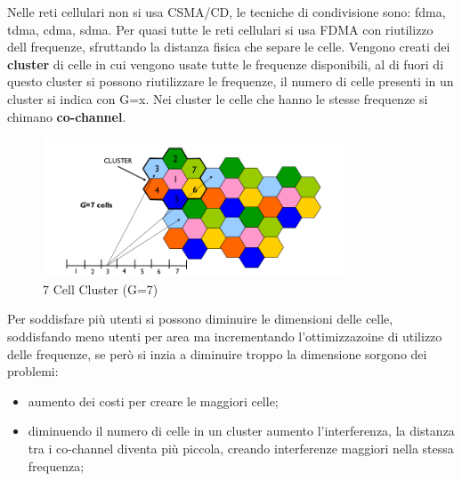 \documentclass[12pt]{article}
\begin{document}
Nelle reti cellulari non si usa CSMA/CD, le tecniche di condivisione sono: fdma, tdma, cdma, sdma. Per quasi tutte le reti cellulari si usa FDMA con riutilizzo dell frequenze, sfruttando la distanza fisica che separe le celle. Vengono creati dei \textbf{cluster} di celle in cui vengono usate tutte le frequenze disponibili, al di fuori di questo cluster si possono riutilizzare le frequenze, il numero di celle presenti in un cluster si indica con G=x. Nei cluster le celle che hanno le stesse frequenze si chimano \textbf{co-channel}.
\begin{figure}[H]
    \centering
    \includegraphics[width=0.8\textwidth]{7-cell-cluster.png}
    \caption{7 Cell Cluster (G=7)}
    \label{fig:7-cell-cluster}
\end{figure}
Per soddisfare pi\`u utenti si possono diminuire le dimensioni delle celle, soddisfando meno utenti per area ma incrementando l'ottimizzazoine di utilizzo delle frequenze, se per\`o si inzia a diminuire troppo la dimensione sorgono dei problemi:
\begin{itemize}
    \item aumento dei costi per creare le maggiori celle;
    \item diminuendo il numero di celle in un cluster aumento l'interferenza, la distanza tra i co-channel diventa pi\`u piccola, creando interferenze maggiori nella stessa frequenza;
\end{itemize}
\end{document}
